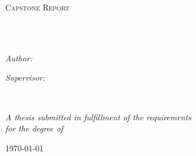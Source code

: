 \documentclass[
12pt, %
oneside, %
english, %
doublespacing, %
headsepline, %
]{MastersDoctoralThesis} %
\author{Hrishi \textsc{Olickel}} %
\begin{document}
\frontmatter %

\pagestyle{plain} %


\begin{titlepage}
\begin{center}

\vspace*{.06\textheight}
{\scshape\LARGE \univname\par}\vspace{1.5cm} %
\textsc{\Large Capstone Report}\\[0.5cm] %

\HRule \\[0.4cm] %
{\huge \bfseries \ttitle\par}\vspace{0.4cm} %
\HRule \\[1.5cm] %

\begin{minipage}[t]{0.4\textwidth}
\begin{flushleft} \large
\emph{Author:}\\
{\authorname} %
\end{flushleft}
\end{minipage}
\begin{minipage}[t]{0.4\textwidth}
\begin{flushright} \large
\emph{Supervisor:} \\
{\supname} %
\end{flushright}
\end{minipage}\\[3cm]

\vfill

\large \textit{A thesis submitted in fulfillment of the requirements\\ for the degree of \degreename}\\[0.3cm] %

\vfill

{\large \today}\\[4cm] %

\vfill
\end{center}
\end{titlepage}
\end{document}
